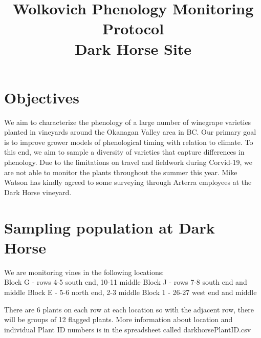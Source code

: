 \documentclass[11pt,letter]{article}
\begin{document}

\renewcommand{\refname}{\CHead{}}

\title{Wolkovich Phenology Monitoring Protocol\\
Dark Horse Site}
\date{ }
\maketitle
\tableofcontents

\section{Objectives}
We aim to characterize the phenology of a large number of winegrape varieties planted in vineyards around the Okanagan Valley area in BC. Our primary goal is to improve grower models of phenological timing with relation to climate. To this end, we aim to sample a diversity of varieties that capture differences in phenology. Due to the limitations on travel and fieldwork during Corvid-19, we are not able to monitor the plants throughout the summer this year. Mike Watson has kindly agreed to some surveying through Arterra employees at the Dark Horse vineyard.

\section{Sampling population at Dark Horse}
We are monitoring vines in the following locations: \\
Block G - rows 4-5 south end, 10-11 middle
Block J - rows 7-8 south end and middle
Block E - 5-6 north end, 2-3 middle
Block 1 - 26-27 west end and middle

There are 6 plants on each row at each location so with the adjacent row, there will be groups of 12 flagged plants. More information about location and individual Plant ID numbers is in the spreadsheet called darkhorsePlantID.csv
\end{document}
